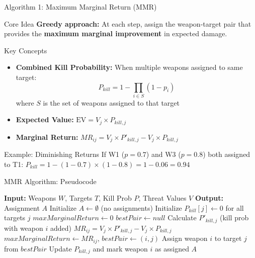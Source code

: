 \documentclass[aspectratio=43,8pt]{beamer}
\begin{document}
\begin{frame}{Algorithm 1: Maximum Marginal Return (MMR)}
\begin{block}{Core Idea}
\textbf{Greedy approach:} At each step, assign the weapon-target pair that provides the \textbf{maximum marginal improvement} in expected damage.
\end{block}

\vspace{0.2cm}
\begin{exampleblock}{Key Concepts}
\begin{itemize}
    \item \textbf{Combined Kill Probability:} When multiple weapons assigned to same target:
    $$P_{kill} = 1 - \prod_{i \in S} (1 - p_i)$$
    where $S$ is the set of weapons assigned to that target
    \item \textbf{Expected Value:} $\text{EV} = V_j \times P_{kill,j}$
    \item \textbf{Marginal Return:} $MR_{ij} = V_j \times P'_{kill,j} - V_j \times P_{kill,j}$
\end{itemize}
\end{exampleblock}

\begin{alertblock}{Example: Diminishing Returns}
If W1 ($p=0.7$) and W3 ($p=0.8$) both assigned to T1:
$P_{kill} = 1 - (1-0.7) \times (1-0.8) = 1 - 0.06 = 0.94$
\end{alertblock}
\end{frame}

\begin{frame}[fragile]{MMR Algorithm: Pseudocode}
\begin{algorithm}[H]
\caption{Maximum Marginal Return (MMR) Heuristic for WTA}
\begin{algorithmic}[1]
\State \textbf{Input:} Weapons $W$, Targets $T$, Kill Prob $P$, Threat Values $V$
\State \textbf{Output:} Assignment $A$
\State Initialize $A \gets \emptyset$ (no assignments)
\State Initialize $P_{kill}[j] \gets 0$ for all targets $j$
    \State $maxMarginalReturn \gets 0$
    \State $bestPair \gets null$
            \State Calculate $P'_{kill,j}$ (kill prob with weapon $i$ added)
            \State $MR_{ij} = V_j \times P'_{kill,j} - V_j \times P_{kill,j}$
                \State $maxMarginalReturn \gets MR_{ij}$, $bestPair \gets (i,j)$
            \EndIf
        \EndFor
    \EndFor
    \State Assign weapon $i$ to target $j$ from $bestPair$
    \State Update $P_{kill,j}$ and mark weapon $i$ as assigned
\EndWhile
\State \Return $A$
\end{algorithmic}
\end{algorithm}
\end{frame}
\end{document}
